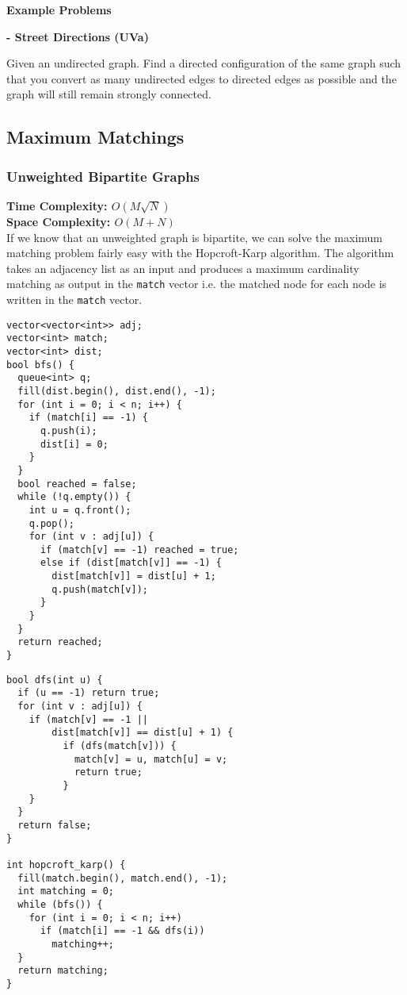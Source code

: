 \textbf{Example Problems}

\begin{problem}
  \textbf{- Street Directions (UVa)} \cite{BridgesStreetDirections}

  Given an undirected graph. Find a directed configuration of
  the same graph such that you convert as many
  undirected edges to directed edges as possible and
  the graph will still remain strongly connected.
\end{problem}

\newpage

\subsection{Maximum Matchings}
\subsubsection{Unweighted Bipartite Graphs}
\textbf{Time Complexity: $O(M\sqrt{N})$}\\
\textbf{Space Complexity: $O(M + N)$}\\

If we know that an unweighted graph is bipartite, we can solve the maximum matching problem
fairly easy with the Hopcroft-Karp algorithm. \cite{Hopcroft2006Jul}
The algorithm takes an adjacency list as an input and 
produces a maximum cardinality matching as output
in the \lstinline{match} vector i.e. 
the matched node for each node is written
in the \lstinline{match} vector.


\begin{center}
\begin{minipage}[t]{0.45\linewidth}
\begin{lstlisting}
vector<vector<int>> adj;
vector<int> match;
vector<int> dist;
bool bfs() {
  queue<int> q;
  fill(dist.begin(), dist.end(), -1);
  for (int i = 0; i < n; i++) {
    if (match[i] == -1) {
      q.push(i);
      dist[i] = 0;
    }
  }
  bool reached = false;
  while (!q.empty()) {
    int u = q.front();
    q.pop();
    for (int v : adj[u]) {
      if (match[v] == -1) reached = true;
      else if (dist[match[v]] == -1) {
        dist[match[v]] = dist[u] + 1;
        q.push(match[v]);
      }
    }
  }
  return reached;
}
\end{lstlisting}
\end{minipage}
\qquad
\begin{minipage}[t]{0.45\linewidth}
\begin{lstlisting}
bool dfs(int u) {
  if (u == -1) return true;
  for (int v : adj[u]) {
    if (match[v] == -1 || 
        dist[match[v]] == dist[u] + 1) {
          if (dfs(match[v])) {
            match[v] = u, match[u] = v;
            return true;
          }
    }
  }
  return false;
}

int hopcroft_karp() {
  fill(match.begin(), match.end(), -1);
  int matching = 0;
  while (bfs()) {
    for (int i = 0; i < n; i++)
      if (match[i] == -1 && dfs(i))
        matching++;
  }
  return matching;
}
\end{lstlisting}
\end{minipage}
\end{center}

